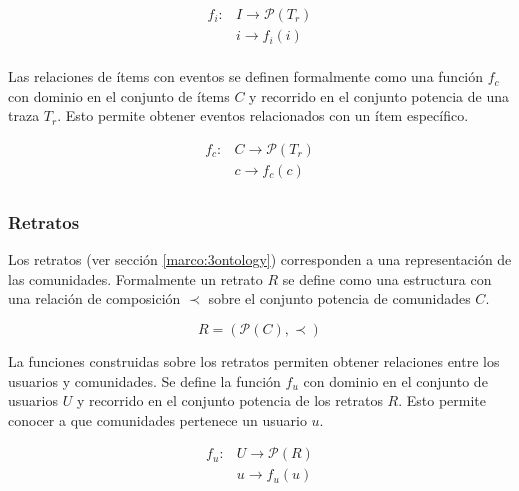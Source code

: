 \begin{equation}
\label{modelo:operacioninteraccion}
	\begin{aligned}
		f_i\colon& I \rightarrow \mathcal{P}(T_r)\\
		& i \rightarrow f_i(i)\\
	\end{aligned}
\end{equation}

Las relaciones de ítems con eventos se definen formalmente como una función $f_c$ con dominio en el conjunto de ítems $C$  y recorrido en el conjunto potencia de una traza $T_r$. Esto permite obtener eventos relacionados con un ítem específico.

\begin{equation}
\label{modelo:operacionitem}
	\begin{aligned}
		f_c\colon& C \rightarrow \mathcal{P}(T_r)\\
		& c \rightarrow f_c(c)\\
	\end{aligned}
\end{equation}

\subsubsection{Retratos}

Los retratos (ver sección \ref{marco:3ontology}) corresponden a una representación de las comunidades. Formalmente un retrato $R$ se define como una estructura con una relación de composición $\prec$ sobre el conjunto potencia de comunidades $C$. 

\begin{equation}
\label{modelo:retratos}
	R = (\mathcal{P}(C),\prec)
\end{equation}

La funciones construidas sobre los retratos permiten obtener relaciones entre los usuarios y comunidades. Se define la función $f_u$ con dominio en el conjunto de usuarios $U$ y recorrido en el conjunto potencia de los retratos $R$. Esto permite conocer a que comunidades pertenece un usuario $u$.

\begin{equation}
\label{modelo:funcionusuarioretratos}
\begin{aligned}
		f_u\colon& U \rightarrow \mathcal{P}(R)\\
		& u \rightarrow f_u(u)\\
	\end{aligned}
\end{equation}

